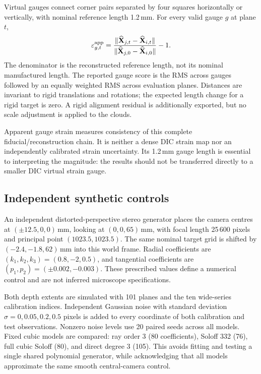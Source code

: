 \documentclass[10pt,a4paper]{article}
\begin{document}
Virtual gauges connect corner pairs separated by four squares horizontally or vertically, with nominal reference length 1.2\,mm. For every valid gauge $g$ at plane $t$,
\begin{equation}
 \varepsilon_{g,t}^{\rm app}
 =\frac{\|\widehat{\mathbf X}_{j,t}-\widehat{\mathbf X}_{i,t}\|}
 {\|\widehat{\mathbf X}_{j,0}-\widehat{\mathbf X}_{i,0}\|}-1.
 \label{eq:gauge}
\end{equation}
The denominator is the reconstructed reference length, not its nominal manufactured length. The reported gauge score is the RMS across gauges followed by an equally weighted RMS across evaluation planes. Distances are invariant to rigid translations and rotations; the expected length change for a rigid target is zero. A rigid alignment residual is additionally exported, but no scale adjustment is applied to the clouds.

Apparent gauge strain measures consistency of this complete fiducial/reconstruction chain. It is neither a dense DIC strain map nor an independently calibrated strain uncertainty. Its 1.2\,mm gauge length is essential to interpreting the magnitude: the results should not be transferred directly to a smaller DIC virtual strain gauge.

\subsection{Independent synthetic controls}
An independent distorted-perspective stereo generator places the camera centres at $(\pm12.5,0,0)$\,mm, looking at $(0,0,65)$\,mm, with focal length 25\,600 pixels and principal point $(1023.5,1023.5)$. The same nominal target grid is shifted by $(-2.4,-1.8,62)$\,mm into this world frame. Radial coefficients are $(k_1,k_2,k_3)=(0.8,-2,0.5)$, and tangential coefficients are $(p_1,p_2)=(\pm0.002,-0.003)$. These prescribed values define a numerical control and are not inferred microscope specifications.

Both depth extents are simulated with 101 planes and the ten wide-series calibration indices. Independent Gaussian noise with standard deviation $\sigma=0,0.05,0.2,0.5$ pixels is added to every coordinate of both calibration and test observations. Nonzero noise levels use 20 paired seeds across all models. Fixed cubic models are compared: ray order 3 (80 coefficients), Soloff 332 (76), full cubic Soloff (80), and direct degree 3 (105). This avoids fitting and testing a single shared polynomial generator, while acknowledging that all models approximate the same smooth central-camera control.
\end{document}
